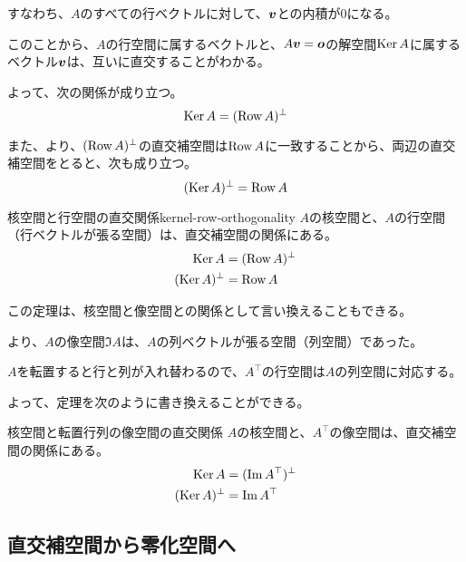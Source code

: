 \documentclass[../../../topic_linear-algebra]{subfiles}
\begin{document}
すなわち、$A$のすべての行ベクトルに対して、$\vb*{v}$との内積が0になる。

\br

このことから、$A$の行空間に属するベクトルと、$A\vb*{v} = \vb*{o}$の解空間$\operatorname{Ker} A$に属するベクトル$\vb*{v}$は、互いに直交することがわかる。

よって、次の関係が成り立つ。
\begin{equation*}
  \operatorname{Ker} A = (\operatorname{Row} A)^\perp
\end{equation*}

また、より、$(\operatorname{Row} A)^\perp$の直交補空間は$\operatorname{Row} A$に一致することから、両辺の直交補空間をとると、次も成り立つ。
\begin{equation*}
  (\operatorname{Ker} A)^\perp = \operatorname{Row} A
\end{equation*}

\begin{theorem}{核空間と行空間の直交関係}{kernel-row-orthogonality}
  $A$の核空間と、$A$の行空間（行ベクトルが張る空間）は、直交補空間の関係にある。
  \begin{align*}
    \operatorname{Ker} A &= (\operatorname{Row} A)^\perp \\
    (\operatorname{Ker} A)^\perp &= \operatorname{Row} A
  \end{align*}
\end{theorem}

この定理は、核空間と像空間との関係として言い換えることもできる。

\br

より、$A$の像空間$\Im A$は、$A$の列ベクトルが張る空間（列空間）であった。

$A$を転置すると行と列が入れ替わるので、$A^\top$の行空間は$A$の列空間に対応する。

\br

よって、定理を次のように書き換えることができる。

\begin{theorem*}{核空間と転置行列の像空間の直交関係}
  $A$の核空間と、$A^\top$の像空間は、直交補空間の関係にある。
  \begin{align*}
    \operatorname{Ker} A &= (\Im A^\top)^\perp \\
    (\operatorname{Ker} A)^\perp &= \Im A^\top
  \end{align*}
\end{theorem*}

\subsection{直交補空間から零化空間へ}
\end{document}
